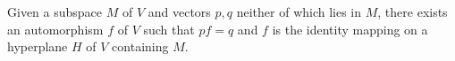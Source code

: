 Given a subspace $M$ of $V$ and vectors $p, q$ neither of which lies in $M$, there exists an automorphism $f$ of $V$ such that $pf = q$ and $f$ is the identity mapping on a hyperplane $H$ of $V$ containing $M$.
